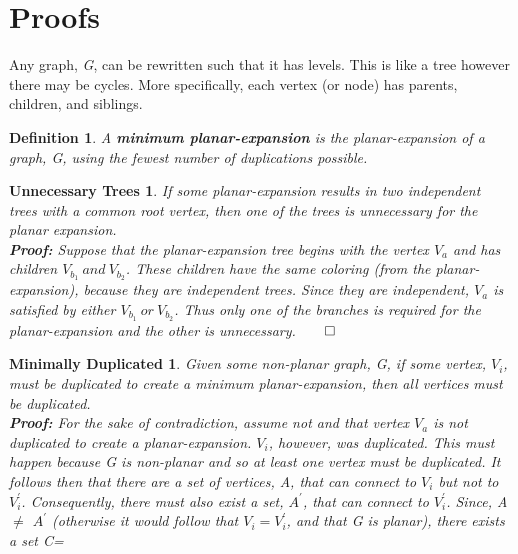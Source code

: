 \documentclass{article}
\newtheorem*{duplication}{Minimally Duplicated}
\newtheorem*{trees}{Unnecessary Trees}
\newtheorem{mydef}{Definition}
\begin{document}


\section{Proofs}
Any graph, \emph{G}, can be rewritten such that it has levels.  This is like a 
tree however there may be cycles.  More specifically, each vertex (or node) has
parents, children, and siblings.

\theoremstyle{definition}
\begin{mydef}
A \textbf{minimum planar-expansion} is the planar-expansion of a graph, G, using
the fewest number of duplications possible.
\end{mydef}

\begin{trees}
If some planar-expansion results in two independent trees with a common root 
vertex, then one of the trees is unnecessary for the planar expansion.\\
\textbf{Proof: }Suppose that the planar-expansion tree begins with the vertex 
$V_a$ and has children $V_{b_1}\ and\ V_{b_2}$. These children have the same
coloring (from the planar-expansion), because they are independent trees.  Since
they are independent, $V_a$ is satisfied by either $V_{b_1}\ or\ V_{b_2}$.  Thus
only one of the branches is required for the planar-expansion and the other is
unnecessary.$\qed$
\end{trees}

\begin{duplication}
Given some non-planar graph, G, if some vertex, $V_i$, must be duplicated to 
create a minimum planar-expansion, then all vertices must be duplicated.\\
\textbf{Proof: }For the sake of contradiction, assume not and that vertex $V_a$
is not duplicated to create a planar-expansion. $V_i$, however, was duplicated.
This must happen because \emph{G} is non-planar and so at least one vertex must
be duplicated. It follows then that there are a set of vertices, \emph{A}, that
can connect to $V_i$ but not to $V^{'}_{i}$. Consequently, there must also exist
a set, \emph{$A^{'}$}, that can connect to $V^{'}_{i}$. Since, \emph{A}$\neq$
\emph{$A^{'}$} (otherwise it would follow that $V_{i}=V^{'}_{i}$, and that 
\emph{G} is planar), there exists a set \emph{C}=
\end{duplication}
\end{document}
